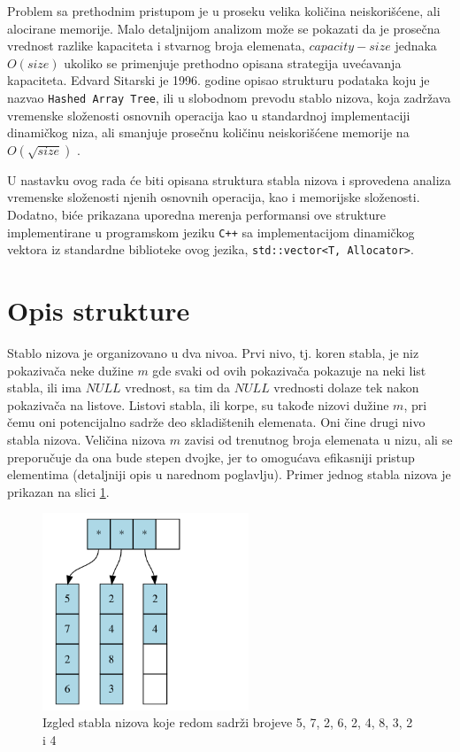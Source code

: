 \documentclass[a4paper]{article}
\begin{document}
Problem sa prethodnim pristupom je u proseku velika količina neiskorišćene, ali alocirane memorije. Malo detaljnijom analizom može se pokazati da je prosečna vrednost razlike kapaciteta i stvarnog broja elemenata, $capacity - size$ jednaka $O(size)$ ukoliko se primenjuje prethodno opisana strategija uvećavanja kapaciteta. Edvard Sitarski je 1996. godine opisao strukturu podataka koju je nazvao \verb|Hashed Array Tree|, ili u slobodnom prevodu stablo nizova, koja zadržava vremenske složenosti osnovnih operacija kao u standardnoj implementaciji dinamičkog niza, ali smanjuje prosečnu količinu neiskorišćene memorije na $O(\sqrt{size})$ \cite{hat-sitarski}.

U nastavku ovog rada će biti opisana struktura stabla nizova i sprovedena analiza vremenske složenosti njenih osnovnih operacija, kao i memorijske složenosti. Dodatno, biće prikazana uporedna merenja performansi ove strukture implementirane u programskom jeziku \verb|C++| sa implementacijom dinamičkog vektora iz standardne biblioteke ovog jezika, \verb|std::vector<T, Allocator>|.

\section{Opis strukture}

Stablo nizova je organizovano u dva nivoa. Prvi nivo, tj. koren stabla, je niz pokazivača neke dužine $m$ gde svaki od ovih pokazivača pokazuje na neki list stabla, ili ima $NULL$ vrednost, sa tim da $NULL$ vrednosti dolaze tek nakon pokazivača na listove. Listovi stabla, ili korpe, su takođe nizovi dužine $m$, pri čemu oni potencijalno sadrže deo skladištenih elemenata. Oni čine drugi nivo stabla nizova. Veličina nizova $m$ zavisi od trenutnog broja elemenata u nizu, ali se preporučuje da ona bude stepen dvojke, jer to omogućava efikasniji pristup elementima (detaljniji opis u narednom poglavlju). Primer jednog stabla nizova je prikazan na slici \ref{fig:hat-struktura-primer}.

\begin{figure}[h!]
    \centering
    \includegraphics[width=0.55\textwidth]{ilustracije/hat-struktura-primer.png}
    \caption{Izgled stabla nizova koje redom sadrži brojeve 5, 7, 2, 6, 2, 4, 8, 3, 2 i 4}
    \label{fig:hat-struktura-primer}
\end{figure}
\end{document}
